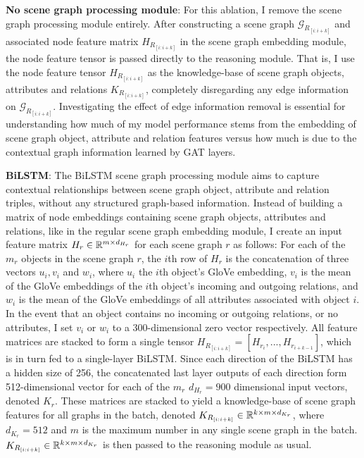 
\textbf{No scene graph processing module}: For this ablation, I remove the scene graph processing module entirely. After constructing a scene graph \(\mathcal{G}_{R_{[i:i+k]}}\) and associated node feature matrix \(H_{R_{[i:i+k]}}\) in the scene graph embedding module, the node feature tensor is passed directly to the reasoning module. That is, I use the node feature tensor \(H_{R_{[i:i+k]}}\) as the knowledge-base of scene graph objects, attributes and relations \(K_{R_{[i:i+k]}}\), completely disregarding any edge information on \(\mathcal{G}_{R_{[i:i+k]}}\). Investigating the effect of edge information removal is essential for understanding how much of my model performance stems from the embedding of scene graph object, attribute and relation features versus how much is due to the contextual graph information learned by GAT layers.

\textbf{BiLSTM}: The BiLSTM scene graph processing module aims to capture contextual relationships between scene graph object, attribute and relation triples, without any structured graph-based information. Instead of building a matrix of node embeddings containing scene graph objects, attributes and relations, like in the regular scene graph embedding module, I create an input feature matrix \(H_r \in \mathbb{R}^{m \times d_{H_r}}\) for each scene graph \(r\) as follows: For each of the \(m_r\) objects in the scene graph \(r\), the \(i\)th row of \(H_r\) is the concatenation of three vectors \(u_i, v_i\) and \(w_i\), where \(u_i\) the \(i\)th object's GloVe embedding, \(v_i\) is the mean of the GloVe embeddings of the \(i\)th object's incoming and outgoing relations, and \(w_i\) is the mean of the GloVe embeddings of all attributes associated with object \(i\). In the event that an object contains no incoming or outgoing relations, or no attributes, I set \(v_i\) or \(w_i\) to a 300-dimensional zero vector respectively. All feature matrices are stacked to form a single tensor \(H_{R_{[i:i+k]}} = [H_{r_i}, ..., H_{r_{i+k-1}}]\), which is in turn fed to a single-layer BiLSTM. Since each direction of the BiLSTM has a hidden size of 256, the concatenated last layer outputs of each direction form 512-dimensional vector for each of the \(m_r\) \(d_{H_r} = 900\) dimensional input vectors, denoted \(K_r\). These matrices are stacked to yield a knowledge-base of scene graph features for all graphs in the batch, denoted \(K_{R_{[i:i+k]}} \in \mathbb{R}^{k \times m \times d_{K_r}}\), where \(d_{K_r} = 512\) and \(m\) is the maximum number in any single scene graph in the batch. \(K_{R_{[i:i+k]}} \in \mathbb{R}^{k \times m \times d_{K_r}}\) is then passed to the reasoning module as usual.

